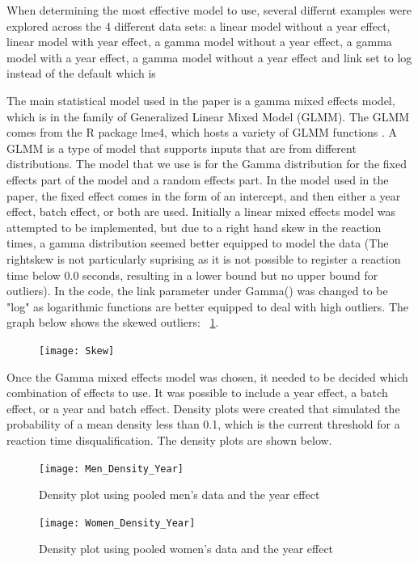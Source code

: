\documentclass[12pt, letterpaper, titlepage]{article}
\begin{document}
When determining the most effective model to use, several differnt examples were
explored across the 4 different data sets: a linear model without a year effect,
linear model with year effect, a gamma model without a year effect, a gamma model
with a year effect, a gamma model without a year effect and link set to log instead
of the default which is 

The main statistical model used in the paper is a gamma mixed effects model, which is
in the family of Generalized Linear Mixed Model (GLMM). The GLMM comes from the R package 
lme4, which hosts a variety of GLMM functions \citep{Rpkg:lme4}.  A GLMM is a type of model
that supports inputs that are from different distributions.  The model that we use is for the
Gamma distribution for the fixed effects part of the model and a random effects part.  In
the model used in the paper, the fixed effect comes in the form of an intercept, and then
either a year effect, batch effect, or both are used.  Initially a linear mixed effects
model was attempted to be implemented, but due to a right hand skew in the reaction times, 
a gamma distribution seemed better equipped to model the data (The rightskew is not 
particularly suprising as it is not possible to register a reaction time below 0.0 
seconds, resulting in a lower bound but no upper bound for outliers). In the code, the 
link parameter under Gamma() was changed to be "log" as logarithmic functions are better 
equipped to deal with high outliers.  The graph below shows the skewed outliers: ~\ref{fig:Skew}.
\begin{figure}[h]
  \centering 
  \texttt{[image: Skew]}
  \label{fig:Skew}
\end{figure}




Once the Gamma mixed effects model was chosen, it needed to be decided which combination
of effects to use.  It was possible to include a year effect, a batch effect, or a year
and batch effect.  Density plots were created that simulated the probability of a mean
density less than 0.1, which is the current threshold for a reaction time
disqualification.  The density plots are shown below.

\begin{figure}[h]
  \centering
  \begin{minipage}{0.45\textwidth}
      \centering
      \texttt{[image: Men\_Density\_Year]} %
      \caption{Density plot using pooled men's data and the year effect}
  \end{minipage}\hfill
  \begin{minipage}{0.45\textwidth}
      \centering
      \texttt{[image: Women\_Density\_Year]} %
      \caption{Density plot using pooled women's data and the year effect}
  \end{minipage}
\end{figure}
\end{document}
